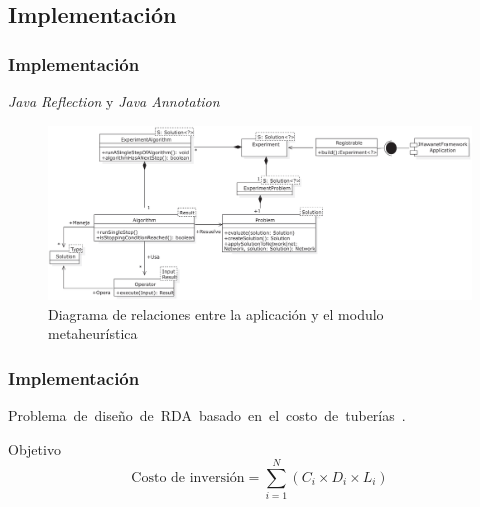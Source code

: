 \documentclass[9pt]{beamer}
\begin{document}



    \subsection{Implementación}

    \begin{frame}
        \frametitle{Implementación}                       
        \textit{Java Reflection} y \textit{Java Annotation}
        \begin{figure}
            \includegraphics[width=\textwidth]{assets/InterfazHumano-app.eps}
            \caption{Diagrama de relaciones entre la aplicación y el modulo metaheurística}
        \end{figure}

    \end{frame}

    \begin{frame}
        \frametitle{Implementación}                       
        Problema de diseño de RDA basado en el costo de tuberías~\citet{Pereyra2017}.

        \begin{block}{Objetivo}
            \begin{equation*}
                \text{Costo de inversión} = \sum_{i=1}^{N} (C_i \times D_i \times L_i)
            \end{equation*}
        \end{block}
        
    \end{frame}
\end{document}
